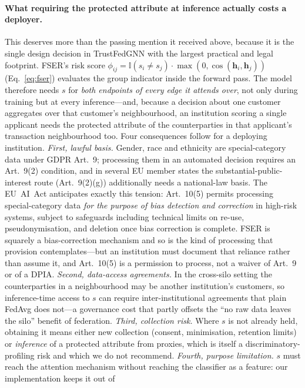 \documentclass[pdflatex,sn-mathphys-num]{sn-jnl}
\theoremstyle{thmstyleone}%
\theoremstyle{thmstyletwo}%
\theoremstyle{thmstylethree}%
\begin{document}
\paragraph{What requiring the protected attribute at inference actually costs a
deployer.}
This deserves more than the passing mention it received above, because it is the
single design decision in TrustFedGNN with the largest practical and legal
footprint. FSER's risk score $\phi_{ij}=\mathbb{I}(s_i\neq s_j)\cdot
\max(0,\cos(\mathbf{h}_i,\mathbf{h}_j))$ (Eq.~\ref{eq:fser}) evaluates the group
indicator inside the forward pass. The model therefore needs $s$ for
\emph{both endpoints of every edge it attends over}, not only during training but
at every inference---and, because a decision about one customer aggregates over
that customer's neighbourhood, an institution scoring a single applicant needs
the protected attribute of the counterparties in that applicant's transaction
neighbourhood too. Four consequences follow for a deploying institution.
\emph{First, lawful basis.} Gender, race and ethnicity are special-category
data under GDPR Art.~9; processing them in an automated decision requires an
Art.~9(2) condition, and in several EU member states the substantial-public-
interest route (Art.~9(2)(g)) additionally needs a national-law basis. The
EU~AI~Act anticipates exactly this tension: Art.~10(5) permits processing
special-category data \emph{for the purpose of bias detection and correction}
in high-risk systems, subject to safeguards including technical limits on
re-use, pseudonymisation, and deletion once bias correction is complete. FSER
is squarely a bias-correction mechanism and so is the kind of processing that
provision contemplates---but an institution must document that reliance rather
than assume it, and Art.~10(5) is a permission to process, not a waiver of
Art.~9 or of a DPIA.
\emph{Second, data-access agreements.} In the cross-silo setting the
counterparties in a neighbourhood may be another institution's customers, so
inference-time access to $s$ can require inter-institutional agreements that
plain FedAvg does not---a governance cost that partly offsets the
``no raw data leaves the silo'' benefit of federation.
\emph{Third, collection risk.} Where $s$ is not already held, obtaining it means
either new collection (consent, minimisation, retention limits) or
\emph{inference} of a protected attribute from proxies, which is itself a
discriminatory-profiling risk and which we do not recommend.
\emph{Fourth, purpose limitation.} $s$ must reach the attention mechanism
without reaching the classifier as a feature: our implementation keeps it out of
\end{document}
